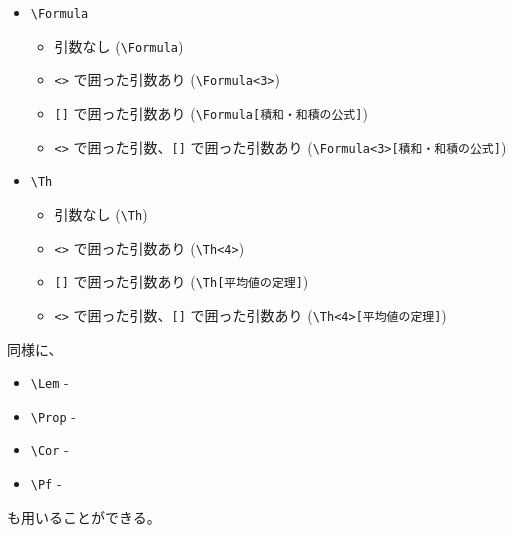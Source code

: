 \documentclass[oneside,10pt,a4paper]{jsarticle}
\begin{document}
\begin{itemize}
\begin{itemize}
\begin{quote}
            \Def[虚数]
          \end{quote}
        \item \verb|<>| で囲った引数、\verb|[]| で囲った引数あり (\verb|\Def<2>[虚数]|)
          \begin{quote}
          \end{quote}
      \end{itemize}
    \newpage
    \item \verb|\Formula|
      \begin{itemize}
        \item 引数なし (\verb|\Formula|)
          \begin{quote}
            \Formula
          \end{quote}
        \item \verb|<>| で囲った引数あり (\verb|\Formula<3>|)
          \begin{quote}
          \end{quote}
        \item \verb|[]| で囲った引数あり (\verb|\Formula[積和・和積の公式]|)
          \begin{quote}
            \Formula[積和・和積の公式]
          \end{quote}
        \item \verb|<>| で囲った引数、\verb|[]| で囲った引数あり (\verb|\Formula<3>[積和・和積の公式]|)
          \begin{quote}
          \end{quote}
      \end{itemize}
    \item \verb|\Th|
      \begin{itemize}
        \item 引数なし (\verb|\Th|)
          \begin{quote}
            \Th
          \end{quote}
        \item \verb|<>| で囲った引数あり (\verb|\Th<4>|)
          \begin{quote}
          \end{quote}
        \item \verb|[]| で囲った引数あり (\verb|\Th[平均値の定理]|)
          \begin{quote}
            \Th[平均値の定理]
          \end{quote}
        \item \verb|<>| で囲った引数、\verb|[]| で囲った引数あり (\verb|\Th<4>[平均値の定理]|)
          \begin{quote}
          \end{quote}
      \end{itemize}
  \end{itemize}

  同様に、
  \begin{itemize}
    \item \verb|\Lem| - \Lem
    \item \verb|\Prop| - \Prop
    \item \verb|\Cor| - \Cor
    \item \verb|\Pf| - \Pf
  \end{itemize}
  も用いることができる。
\end{document}
